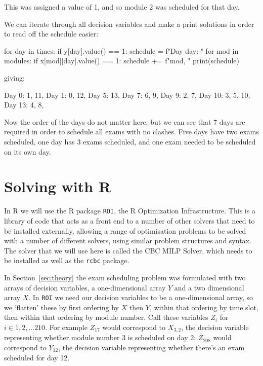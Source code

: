 This was assigned a value of 1, and so module 2 was scheduled for that day.

We can iterate through all decision variables and make a print solutions in
order to read off the schedule easier:

\begin{pyin}
for day in times:
    if y[day].value() == 1:
        schedule = f"Day {day}: "
        for mod in modules:
            if x[mod][day].value() == 1:
                 schedule += f"{mod}, "
        print(schedule)
\end{pyin}

giving:

\begin{pyout}
Day 0: 1, 11, 
Day 1: 0, 12, 
Day 5: 13, 
Day 7: 6, 9, 
Day 9: 2, 7, 
Day 10: 3, 5, 10, 
Day 13: 4, 8, 
\end{pyout}

Now the order of the days do not matter here, but we can see that 7 days are
required in order to schedule all exams with no clashes. Five days have two
exams scheduled, one day has 3 exams scheduled, and one exam needed to be
scheduled on its own day.


\section{Solving with R}\label{sec:solving-with-R}

In R we will use the R package \texttt{ROI}, the R Optimization
Infrastructure.
This is a library of code that acts as a front end to a number of other solvers
that need to be installed externally, allowing a range of optimisation problems
to be solved with a number of different solvers, using similar problem
structures and syntax.
The solver that we will use here is called the CBC MILP Solver, which needs to
be installed as well as the \texttt{rcbc} package.

In Section~\ref{sec:theory} the exam scheduling problem was formulated with two
arrays of decision variables, a one-dimensional array $Y$ and a two dimensional
array $X$.
In \texttt{ROI} we need our decision variables to be a one-dimensional
array, so we `flatten' these by first ordering by $X$ then $Y$, within that
ordering by time slot, then within that ordering by module number.
Call these variables $Z_i$ for $i \in 1, 2, ... 210$.
For example $Z_{17}$ would correspond to $X_{3, 2}$, the decision variable
representing whether module number 3 is scheduled on day 2; $Z_{208}$ would
correspond to $Y_{12}$, the decision variable representing whether there's an
exam scheduled for day 12.

